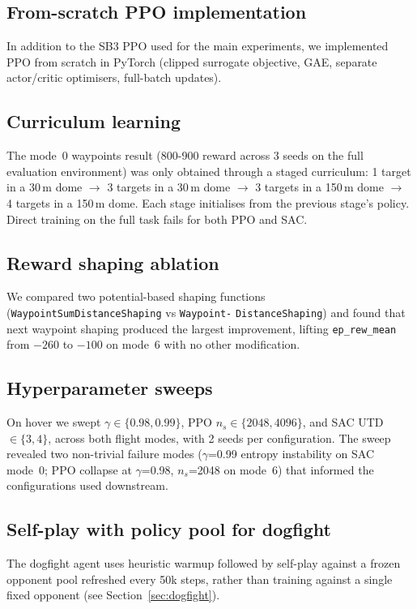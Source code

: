 \documentclass[11pt,a4paper]{article}
\begin{document}
\subsection{From-scratch PPO implementation}
In addition to the SB3 PPO used for the main experiments, we implemented PPO from
scratch in PyTorch (clipped surrogate objective, GAE, separate actor/critic
optimisers, full-batch updates). 

\subsection{Curriculum learning}
The mode~0 waypoints result (800-900 reward across 3 seeds on the full evaluation
environment) was only obtained through a staged curriculum: 1 target in a 30\,m dome
$\to$ 3 targets in a 30\,m dome $\to$ 3 targets in a 150\,m dome $\to$ 4 targets in
a 150\,m dome. Each stage initialises from the previous stage's policy. Direct
training on the full task fails for both PPO and SAC.

\subsection{Reward shaping ablation}
We compared two potential-based shaping functions (\texttt{WaypointSumDistanceShaping}
vs \texttt{Waypoint-} \texttt{DistanceShaping}) and found that next waypoint shaping
produced the largest improvement, lifting
\texttt{ep\_rew\_mean} from $-260$ to $-100$ on mode~6 with no other modification.

\subsection{Hyperparameter sweeps}
On hover we swept $\gamma \in \{0.98, 0.99\}$, PPO $n_s \in \{2048, 4096\}$, and
SAC UTD $\in \{3, 4\}$, across both flight modes, with 2 seeds per configuration.
The sweep revealed two non-trivial failure modes ($\gamma$=0.99 entropy instability
on SAC mode~0; PPO collapse at $\gamma$=0.98, $n_s$=2048 on mode~6) that informed
the configurations used downstream.

\subsection{Self-play with policy pool for dogfight}
The dogfight agent uses heuristic warmup followed by self-play against a frozen
opponent pool refreshed every 50k steps, rather than training against a single fixed
opponent (see Section~\ref{sec:dogfight}).
\end{document}

